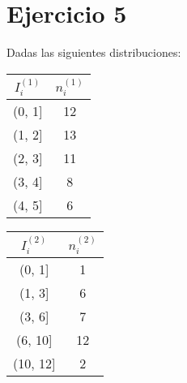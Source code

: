 \documentclass[a4paper,12pt]{article}
\begin{document}
\section*{Ejercicio 5}
Dadas las siguientes distribuciones:

\begin{center}
    \begin{tabular}{|c|c|}
        \hline
        $I_i^{(1)}$ & $n_i^{(1)}$ \\
        \hline
        (0, 1] & 12 \\
        (1, 2] & 13 \\
        (2, 3] & 11 \\
        (3, 4] & 8 \\
        (4, 5] & 6 \\
        \hline
    \end{tabular}
    \quad
    \begin{tabular}{|c|c|}
        \hline
        $I_i^{(2)}$ & $n_i^{(2)}$ \\
        \hline
        (0, 1] & 1 \\
        (1, 3] & 6 \\
        (3, 6] & 7 \\
        (6, 10] & 12 \\
        (10, 12] & 2 \\
        \hline
    \end{tabular}
\end{center}
\end{document}
